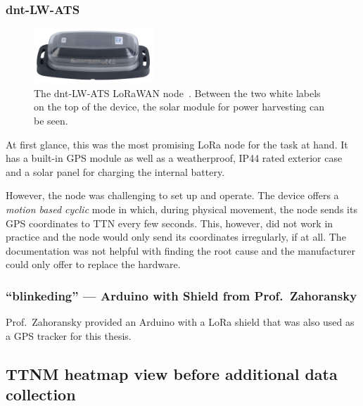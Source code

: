 \subsubsection{dnt-LW-ATS}

\begin{figure}[htbp]
    \centering
    \includegraphics[width=0.4\textwidth]{pictures/hardware/gps-nodes/dnt-LW-ATS.jpg}
    \caption{
        The dnt-LW-ATS \ac{LoRaWAN} node~\protect\cite{dnt_gmbh_dnt_nodate}.
        Between the two white labels on the top of the device, the solar module for power harvesting can be seen.
    }\label{pic:dnt-lw-ats}
\end{figure}

At first glance, this was the most promising \ac{LoRa} node for the task at hand.
It has a built-in \ac{GPS} module as well as a weatherproof, IP44 rated exterior case and a solar panel for charging the internal battery.

However, the node was challenging to set up and operate.
The device offers a \emph{motion based cyclic} mode in which, during physical movement, the node sends its \ac{GPS} coordinates to \ac{TTN} every few seconds.
This, however, did not work in practice and the node would only send its coordinates irregularly, if at all.
The documentation was not helpful with finding the root cause and the manufacturer could only offer to replace the hardware.

\subsubsection{``blinkeding'' --- Arduino with Shield from Prof.\ Zahoransky}


Prof.\ Zahoransky provided an Arduino with a \ac{LoRa} shield that was also used as a \ac{GPS} tracker for this thesis.

\subsection{\acl{TTNM} heatmap view before additional data collection}

